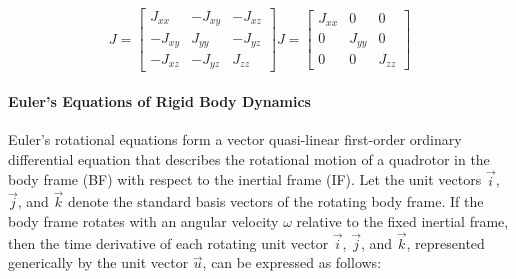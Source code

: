 \begin{equation}
J =
\begin{bmatrix}
J_{xx} & -J_{xy} & -J_{xz} \\
-J_{xy} & J_{yy} & -J_{yz} \\
-J_{xz} & -J_{yz} & J_{zz}
\end{bmatrix} J =
\begin{bmatrix}
J_{xx} & 0 & 0 \\
0 & J_{yy} & 0 \\
0 & 0 & J_{zz}
\end{bmatrix}
\label{3.10} 
\end{equation}







\paragraph*{Euler’s Equations of Rigid Body Dynamics}


Euler's rotational equations form a vector quasi-linear first-order ordinary differential equation that describes the rotational motion of a quadrotor in the body frame (BF) with respect to the inertial frame (IF). Let the unit vectors $\vec{i}$, $\vec{j}$, and $\vec{k}$ denote the standard basis vectors of the rotating body frame. If the body frame rotates with an angular velocity $\omega$ relative to the fixed inertial frame, then the time derivative of each rotating unit vector $\vec{i}$, $\vec{j}$, and $\vec{k}$, represented generically by the unit vector $\vec{u}$, can be expressed as follows:


